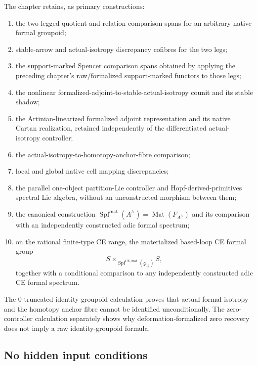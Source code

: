 The chapter retains, as primary constructions:
\begin{enumerate}
    \item the two-legged quotient and relation comparison spans for an arbitrary
    native formal groupoid;
    \item stable-arrow and actual-isotropy discrepancy cofibres for the two
    legs;
    \item the support-marked Spencer comparison spans obtained by applying the
    preceding chapter's raw/formalized support-marked functors to those legs;
    \item the nonlinear formalized-adjoint-to-stable-actual-isotropy counit and its
    stable shadow;
    \item the Artinian-linearized formalized adjoint representation and its
    native Cartan realization, retained independently of the differentiated
    actual-isotropy controller;
    \item the actual-isotropy-to-homotopy-anchor-fibre comparison;
    \item local and global native cell mapping discrepancies;
    \item the parallel one-object partition-Lie controller and
    Hopf-derived-primitives spectral Lie algebra, without an unconstructed
    morphism between them;
    \item the canonical construction
    $\operatorname{Spf}^{\mathrm{mat}}(A^\wedge)=\operatorname{Mat}(F_{A^\wedge})$
    and its comparison with an independently constructed adic formal spectrum;
    \item on the rational finite-type CE range, the materialized based-loop CE
    formal group
    \[
        S\times_{\operatorname{Spf}^{\mathrm{CE,mat}}(\mathfrak g_{\mathrm{dg}})}S,
    \]
    together with a conditional comparison to any independently constructed
    adic CE formal spectrum.
\end{enumerate}
The $0$-truncated identity-groupoid calculation proves that actual formal
isotropy and the homotopy anchor fibre cannot be identified unconditionally.
The zero-controller calculation separately shows why deformation-formalized
zero recovery does not imply a raw identity-groupoid formula.

\subsection{No hidden input conditions}

